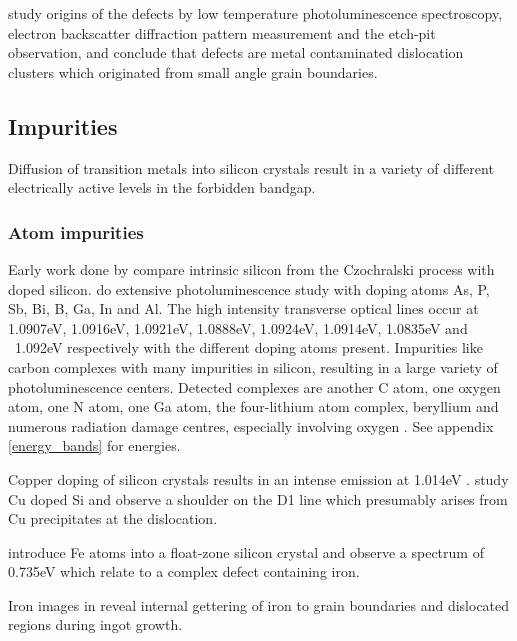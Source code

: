 \cite{sugimoto07} study origins of the defects by low temperature photoluminescence spectroscopy, electron backscatter diffraction pattern measurement and the etch-pit observation, and conclude that defects are metal contaminated dislocation clusters which originated from small angle grain boundaries.





\subsection{Impurities}

Diffusion of transition metals into silicon crystals result in a variety of different electrically active levels in the forbidden bandgap.

\subsubsection{Atom impurities}

Early work done by \cite{dean67} compare intrinsic silicon from the Czochralski process with doped silicon. \cite{dean67} do extensive photoluminescence study with doping atoms As, P, Sb, Bi, B, Ga, In and Al. The high intensity transverse optical lines occur at 1.0907eV, 1.0916eV, 1.0921eV, 1.0888eV, 1.0924eV, 1.0914eV, 1.0835eV and ~1.092eV respectively with the different doping atoms present. Impurities like carbon complexes with many impurities in silicon, resulting in a large variety of photoluminescence centers. Detected complexes are another C atom, one oxygen atom, one N atom, one Ga atom, the four-lithium atom complex, beryllium and numerous radiation damage centres, especially involving oxygen \cite{davies88}. See appendix \ref{energy_bands} for energies.

Copper doping of silicon crystals results in an intense emission at 1.014eV \cite{weber82}. \cite{weronek91} study Cu doped Si and observe a shoulder on the D1 line which presumably arises from Cu precipitates at the dislocation.

\cite{calao88} introduce Fe atoms into a float-zone silicon crystal and observe a spectrum of 0.735eV which relate to a complex defect containing iron.



Iron images in \cite{macdonald08} reveal internal gettering of iron to grain boundaries and dislocated regions during ingot growth.



